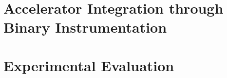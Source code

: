 \newpage


\newpage
\newpage
\section{Accelerator Integration through Binary Instrumentation}
\newpage

\section{Experimental Evaluation }
\label{biev}

